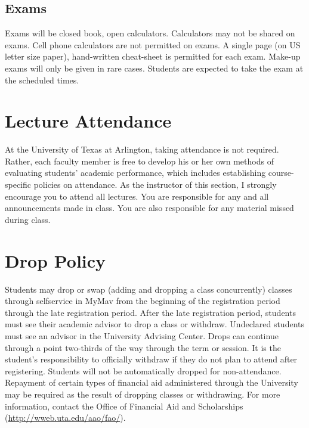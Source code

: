 \documentclass[10pt]{article}
\begin{document}
\subsection*{Exams}
\label{sec:orgheadline7}
Exams will be closed book, open calculators. Calculators may not be shared on exams. Cell phone calculators are not permitted on exams.
A single page (on US letter size paper), hand-written cheat-sheet is permitted for each exam.
Make-up exams will only be given in rare cases. Students are expected to take the exam at the
scheduled times.

\section*{Lecture Attendance}
\label{sec:orgheadline9}
At the University of Texas at Arlington, taking attendance is not required. Rather, each
faculty member is free to develop his or her own methods of evaluating students’ academic performance,
which includes establishing course-specific policies on attendance. As the instructor of this section, I strongly
encourage you to attend all lectures. You are responsible for any and all announcements made in class. You are
also responsible for any material missed during class.
\section*{Drop Policy}
\label{sec:orgheadline10}
Students may drop or swap (adding and dropping a class concurrently) classes through selfservice
in MyMav from the beginning of the registration period through the late registration period. After the
late registration period, students must see their academic advisor to drop a class or withdraw. Undeclared
students must see an advisor in the University Advising Center. Drops can continue through a point two-thirds
of the way through the term or session. It is the student's responsibility to officially withdraw if they do not
plan to attend after registering. Students will not be automatically dropped for non-attendance. Repayment
of certain types of financial aid administered through the University may be required as the result of dropping
classes or withdrawing. For more information, contact the Office of Financial Aid and Scholarships
(\url{http://wweb.uta.edu/aao/fao/}).
\end{document}

